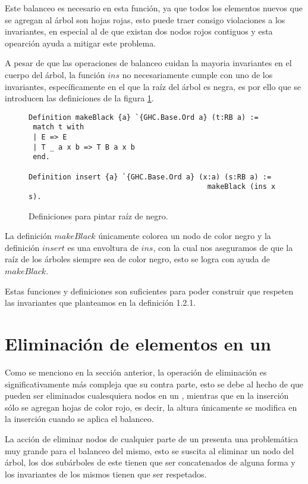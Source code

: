 Este balanceo es necesario en esta funci\'on, ya que todos los elementos nuevos que se agregan al 
\'arbol son hojas rojas, esto puede traer consigo violaciones a los invariantes, en especial al de
que existan dos nodos rojos contiguos y esta opearci\'on ayuda a mitigar este problema.

A pesar de que las operaciones de balanceo cuidan la mayoria invariantes en el cuerpo del \'arbol,
la función $ins$ no necesariamente cumple con uno de los invariantes, espec\'ificamente en el que la
raíz del árbol es negra, es por ello que se introducen las definiciones de la figura 
\ref{raiz_negra_func}.

\begin{figure}
\centering
\captionsetup{justification=centering}
\begin{verbatim}
Definition makeBlack {a} `{GHC.Base.Ord a} (t:RB a) :=
 match t with
 | E => E
 | T _ a x b => T B a x b
 end.

Definition insert {a} `{GHC.Base.Ord a} (x:a) (s:RB a) :=
                                          makeBlack (ins x s).
\end{verbatim}
\caption{Definiciones para pintar ra\'iz de negro.}
\label{raiz_negra_func}
\end{figure}

La definici\'on $makeBlack$ únicamente colorea un nodo de color negro y la definición
$insert$ es una envoltura de $ins$, con la cual nos aseguramos de que la ra\'iz de los \'arboles
siempre sea de color negro, esto se logra con ayuda de $makeBlack$.

Estas funciones y definiciones son suficientes para poder construir {\arns} que respeten las
invariantes que planteamos en la definici\'on 1.2.1.

\section{Eliminación de elementos en un {\arn}}

Como se menciono en la secci\'on anterior, la operaci\'on de eliminaci\'on es significativamente 
m\'as compleja que su contra parte, esto se debe al hecho de que pueden ser eliminados cualesquiera 
nodos en un {\arn}, mientras que en la inserci\'on s\'olo se agregan hojas de color rojo, es decir,
la altura \'unicamente se modifica en la inserción cuando se aplica el balanceo.

La acci\'on de eliminar nodos de cualquier parte de un {\arn} presenta una problemática muy grande 
para el balanceo del mismo, esto se suscita al eliminar un nodo del \'arbol, los dos subárboles de 
este tienen que ser concatenados de alguna forma y los invariantes de los mismos tienen que ser
respetados.

